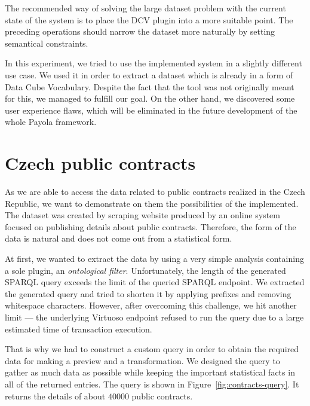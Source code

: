 The recommended way of solving the large dataset problem with the current state of the system
is to place the DCV 
plugin into a more suitable point. The preceding operations should narrow the 
dataset more naturally by setting semantical constraints.

In this experiment, we tried to use the implemented system in a slightly 
different use case. We used it in order to extract a dataset which is already in 
a form of Data Cube Vocabulary. Despite the fact that the tool was not 
originally meant for this, we managed to fulfill our goal. On the other hand, 
we discovered some user experience flaws, which will be eliminated in the future 
development of the whole Payola framework.

\section{Czech public contracts}
As we are able to access the data related to public contracts realized in the 
Czech Republic, we want to demonstrate on them the possibilities of the implemented.
The dataset was created by scraping website produced by an online system focused 
on publishing details about public contracts. Therefore, the form of the data is 
natural and does not come out from a statistical form.

At first, we wanted to extract the data by using a very simple analysis
containing a sole plugin, an \emph{ontological filter}. Unfortunately, the length
of the generated SPARQL query exceeds the limit of the queried SPARQL endpoint.
We extracted the generated query and tried to shorten it by applying prefixes 
and removing whitespace characters. However, after overcoming this challenge, we 
hit another limit --- the underlying Virtuoso endpoint refused to run the query 
due to a large estimated time of transaction execution.

That is why we had to construct a custom query in order to obtain the required 
data for making a preview and a transformation. We designed the query to 
gather as much data as possible while keeping the important statistical facts in 
all of the returned entries. The query is shown in 
Figure~\ref{fig:contracts-query}. It returns the details of about $40000$ public 
contracts.


